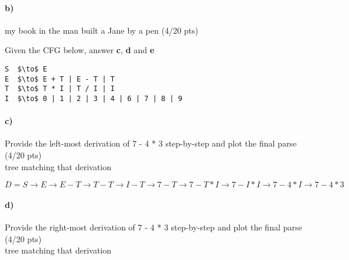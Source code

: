 \documentclass[a4paper,12pt]{article}
\begin{document}
\paragraph{b)} my book in the man built a Jane by a pen \hfill \small{(4/20 pts)} \\

\begin{tcolorbox}
\end{tcolorbox}

\newpage

Given the CFG below, answer \textbf{c}, \textbf{d} and \textbf{e} \\

\begin{lstlisting}[style=output,mathescape=true]
S  $\to$ E
E  $\to$ E + T | E - T | T
T  $\to$ T * I | T / I | I
I  $\to$ 0 | 1 | 2 | 3 | 4 | 6 | 7 | 8 | 9
\end{lstlisting}

\paragraph{c)} Provide the left-most derivation of 7 - 4 * 3 step-by-step and plot the final parse \hfill \small{(4/20 pts)} \\
tree matching that derivation \\

\begin{tcolorbox}
$D = S \to E \to E - T \to T-T \to I-T \to 7-T \to 7-T*I \to 7-I*I \to 7-4*I \to 7-4*3$ \\

\end{tcolorbox}

\paragraph{d)} Provide the right-most derivation of 7 - 4 * 3 step-by-step and plot the final parse \hfill \small{(4/20 pts)} \\
 tree matching that derivation \\
 
\end{document}
